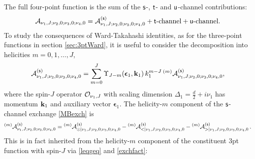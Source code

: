 \documentclass[11pt,a4paper]{article}
\begin{document}
The full four-point function is the sum of the ${\sf s}$-, ${\sf t}$- and ${\sf u}$-channel contributions:
\begin{equation}\label{full4pt}
    {\cal A}_{\nu_1,J;\nu_2,0;\nu_3,0;\nu_4,0} = {\cal A}^{\left({\sf s}\right)}_{\nu_1,J;\nu_2,0;\nu_3,0;\nu_4,0}+ {\sf t}\text{-channel}+ {\sf u}\text{-channel}. 
\end{equation}
To study the consequences of Ward-Takahashi identities, as for the three-point functions in section \ref{sec:3ptWard}, it is useful to consider the decomposition into helicities $m=0, 1, \ldots, J$, 
\begin{equation}
   {\cal A}^{\left({\sf s}\right)}_{\nu_1,J;\nu_2,0;\nu_3,0;\nu_4,0} =\sum^J_{m=0}\Upsilon_{J-m}(\boldsymbol{\epsilon}_1,{\bf k}_1)\, k^{m-J}_1\, {}^{\left(m\right)}{\cal A}^{\left({\sf s}\right)}_{\nu_1,J;\nu_2,0;\nu_3,0;\nu_4,0},
\end{equation}
where the spin-$J$ operator ${\cal O}_{\nu_1,J}$ with scaling dimension $\Delta_1 = \frac{d}{2}+i\nu_1$ has momentum ${\bf k}_1$ and auxiliary vector $\boldsymbol{\epsilon}_1$. The helicity-$m$ component of the ${\sf s}$-channel exchange \eqref{MBexch} is
\begin{multline}  {}^{\left(m\right)}{\cal A}^{\left({\sf s}\right)}_{\nu_1,J;\nu_2,0;\nu_3,0;\nu_4,0} ={}^{\left(m\right)}{\cal A}^{\left({\sf s}\right)}_{\odot|\nu_1,J;\nu_2,0;\nu_3,0;\nu_4,0} -{}^{\left(m\right)}{\cal A}^{\left({\sf s}\right)}_{<|\nu_1,J;\nu_2,0;\nu_3,0;\nu_4,0}-{}^{\left(m\right)}{\cal A}^{\left({\sf s}\right)}_{>|\nu_1,J;\nu_2,0;\nu_3,0;\nu_4,0}\,.  \nonumber
\end{multline}
This is in fact inherited from the helicity-$m$ component of the constituent 3pt function with spin-$J$ via \eqref{leqgeq} and \eqref{exchfact}:
\end{document}
